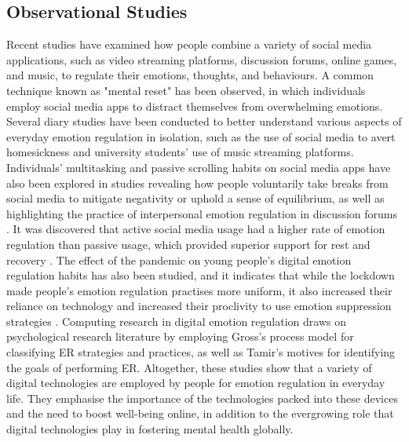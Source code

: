 \documentclass[lettersize,journal]{IEEEtran}
\begin{document}
\subsection{Observational Studies}
Recent studies have examined how people combine a variety of social media applications, such as video streaming platforms, discussion forums, online games, and music, to regulate their emotions, thoughts, and behaviours. A common technique known as "mental reset" has been observed, in which individuals employ social media apps to distract themselves from overwhelming emotions. Several diary studies have been conducted to better understand various aspects of everyday emotion regulation in isolation, such as the use of social media to avert homesickness and university students' use of music streaming platforms. Individuals' multitasking and passive scrolling habits on social media apps have also been explored in studies revealing how people voluntarily take breaks from social media to mitigate negativity or uphold a sense of equilibrium, as well as highlighting the practice of interpersonal emotion regulation in discussion forums \cite{smith2022digital}. It was discovered that active social media usage had a higher rate of emotion regulation than passive usage, which provided superior support for rest and recovery \cite{hossain2022motivational}. The effect of the pandemic on young people's digital emotion regulation habits has also been studied, and it indicates that while the lockdown made people's emotion regulation practises more uniform, it also increased their reliance on technology and increased their proclivity to use emotion suppression strategies \cite{tag2022impact}. Computing research in digital emotion regulation draws on psychological research literature by employing Gross's process model for classifying ER strategies and practices, as well as Tamir's motives for identifying the goals of performing ER. Altogether, these studies show that a variety of digital technologies are employed by people for emotion regulation in everyday life. They emphasise the importance of the technologies packed into these devices and the need to boost well-being online, in addition to the evergrowing role that digital technologies play in fostering mental health globally.
\end{document}
